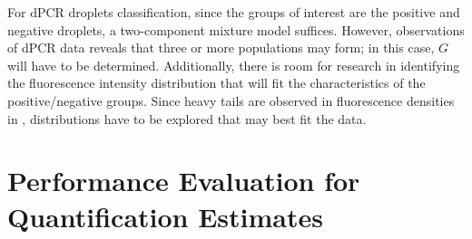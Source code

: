 For dPCR droplets classification, since the groups of interest are the positive and negative droplets, a two-component mixture model suffices. However, observations of dPCR data reveals that three or more populations may form; in this case, \(G\) will have to be determined. Additionally, there is room for research in identifying the fluorescence intensity distribution that will fit the characteristics of the positive/negative groups. Since heavy tails are observed in fluorescence densities in , distributions have to be explored that may best fit the data. 


\section{Performance Evaluation for Quantification Estimates}
\label{sec:ch2_perfeval_estimates}
